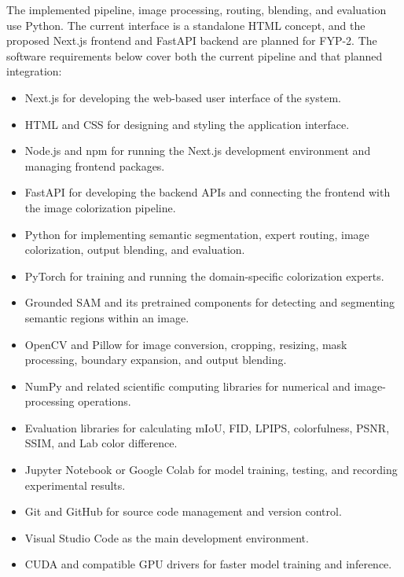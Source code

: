 \documentclass{FastFyp}
\begin{document}
The implemented pipeline, image processing, routing, blending, and evaluation use Python. The current interface is a standalone HTML concept, and the proposed Next.js frontend and FastAPI backend are planned for FYP-2. The software requirements below cover both the current pipeline and that planned integration:

\begin{itemize}
    \item Next.js for developing the web-based user interface of the system.
    
    \item HTML and CSS for designing and styling the application interface.
    
    \item Node.js and npm for running the Next.js development environment and managing frontend packages.
    
    \item FastAPI for developing the backend APIs and connecting the frontend with the image colorization pipeline.
    
    \item Python for implementing semantic segmentation, expert routing, image colorization, output blending, and evaluation.
    
    \item PyTorch for training and running the domain-specific colorization experts.
    
    \item Grounded SAM and its pretrained components for detecting and segmenting semantic regions within an image.
    
    \item OpenCV and Pillow for image conversion, cropping, resizing, mask processing, boundary expansion, and output blending.
    
    \item NumPy and related scientific computing libraries for numerical and image-processing operations.
    
    \item Evaluation libraries for calculating mIoU, FID, LPIPS, colorfulness, PSNR, SSIM, and Lab color difference.
    
    \item Jupyter Notebook or Google Colab for model training, testing, and recording experimental results.
    
    \item Git and GitHub for source code management and version control.
    
    \item Visual Studio Code as the main development environment.
    
    \item CUDA and compatible GPU drivers for faster model training and inference.
\end{itemize}
\end{document}
